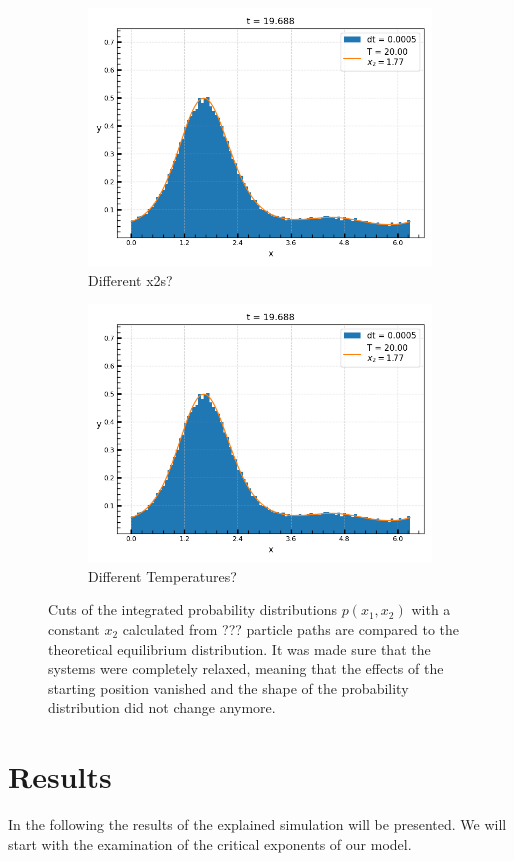 		\begin{figure}[htp]
		\begin{subfigure}{0.5\textwidth}
			\centering
			\includegraphics[width=0.8\linewidth]{graphics/Pair-Equil-Dist-20.png}
			\caption{Different x2s?}
		\end{subfigure}
		\begin{subfigure}{0.5\textwidth}
			\centering
			\includegraphics[width=0.8\linewidth]{graphics/Pair-Equil-Dist-20.png}
			\caption{Different Temperatures?}
		\end{subfigure}
		\caption{Cuts of the integrated probability distributions $p(x_1, x_2)$ with a constant $x_2$ calculated from ??? particle paths are compared to the theoretical equilibrium distribution. It was made sure that the systems were completely relaxed, meaning that the effects of the starting position vanished and the shape of the probability distribution did not change anymore.}
		\label{Fig::Pair-Prob-Dist}
	\end{figure}
	
	\section{Results}
		In the following the results of the explained simulation will be presented. We will start with the examination of the critical exponents of our model. \\
		
